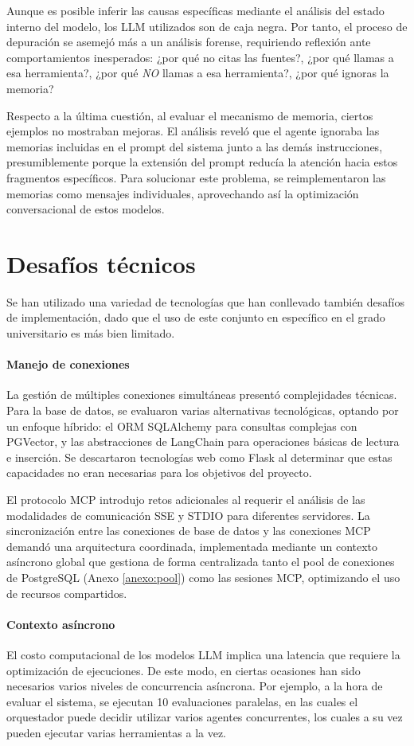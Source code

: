Aunque es posible inferir las causas específicas mediante el análisis del estado interno del modelo, los LLM utilizados son de caja negra. Por tanto, el proceso de depuración se asemejó más a un análisis forense, requiriendo reflexión ante comportamientos inesperados: ¿por qué no citas las fuentes?, ¿por qué llamas a esa herramienta?, ¿por qué \textit{NO} llamas a esa herramienta?, ¿por qué ignoras la memoria?

Respecto a la última cuestión, al evaluar el mecanismo de memoria, ciertos ejemplos no mostraban mejoras. El análisis reveló que el agente ignoraba las memorias incluidas en el prompt del sistema junto a las demás instrucciones, presumiblemente porque la extensión del prompt reducía la atención hacia estos fragmentos específicos. Para solucionar este problema, se reimplementaron las memorias como mensajes individuales, aprovechando así la optimización conversacional de estos modelos.

\section{Desafíos técnicos}
Se han utilizado una variedad de tecnologías que han conllevado también desafíos de implementación, dado que el uso de este conjunto en específico en el grado universitario es más bien limitado.

\paragraph{Manejo de conexiones}
La gestión de múltiples conexiones simultáneas presentó complejidades técnicas. Para la base de datos, se evaluaron varias alternativas tecnológicas, optando por un enfoque híbrido: el ORM SQLAlchemy para consultas complejas con PGVector, y las abstracciones de LangChain para operaciones básicas de lectura e inserción. Se descartaron tecnologías web como Flask al determinar que estas capacidades no eran necesarias para los objetivos del proyecto.

El protocolo MCP introdujo retos adicionales al requerir el análisis de las modalidades de comunicación SSE y STDIO para diferentes servidores. La sincronización entre las conexiones de base de datos y las conexiones MCP demandó una arquitectura coordinada, implementada mediante un contexto asíncrono global que gestiona de forma centralizada tanto el pool de conexiones de PostgreSQL (Anexo \ref{anexo:pool}) como las sesiones MCP, optimizando el uso de recursos compartidos.

\paragraph{Contexto asíncrono}
El costo computacional de los modelos LLM implica una latencia que requiere la optimización de ejecuciones. De este modo, en ciertas ocasiones han sido necesarios varios niveles de concurrencia asíncrona. Por ejemplo, a la hora de evaluar el sistema, se ejecutan 10 evaluaciones paralelas, en las cuales el orquestador puede decidir utilizar varios agentes concurrentes, los cuales a su vez pueden ejecutar varias herramientas a la vez. 

